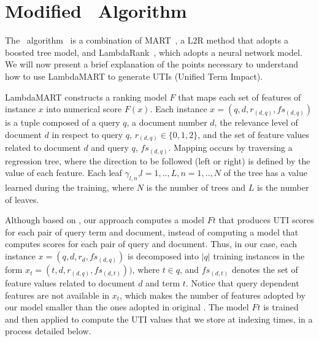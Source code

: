 \documentclass[preprint,review,10pt,3p]{elsarticle}
\begin{document}



\section{Modified \lambdamart\ Algorithm}
\label{lambda}
\newcommand{\lamdamart}{LambdaMART}

The \lambdamart\ algorithm~\cite{wu2010lambdamart} is a combination of
MART~\cite{Jerome2001}, a L2R method that adopts a boosted tree model, and LambdaRank~\cite{Burges2006},
which adopts a neural network model. 
We will
now present a brief explanation of the points necessary to understand
how to use LambdaMART to generate UTIs (Unified Term Impact).

LambdaMART constructs a ranking model $F$ that maps
each set of features of instance $x$ into numerical score $F(x)$. Each instance $x=(q,d,r_{(d,q)},fs_{(d,q)})$ is a tuple composed of a query $q$, a document number $d$, the relevance level of document $d$ in respect to query $q$, $r_{(d,q)} \in \{0,1,2\}$, and the set of feature values related to document $d$ and query $q$, $fs_{(d,q)}$.   Mapping occurs by traversing a regression tree, where the direction to be followed (left or right) is defined by the value of each feature. Each leaf $\gamma_{l,n}$,$l=1,..,L, n=1,..,N$ of the tree has a value learned during the training, where $N$ is the number of trees and $L$ is the number of leaves.

Although based on \lambdamart, our approach computes a model $Ft$
that produces UTI scores for each pair of query term and document, instead of computing a  model that computes scores for each pair of query and document. Thus, in our case, each instance $x=(q,d,r_d,fs_{(d,q)})$ is
decomposed into $|q|$ training instances in the form $x_t=
(t,d,r_{(d,q)},fs_{(d,t)}))$, where $t \in q$, and $fs_{(d,t)}$ denotes the
set of feature values related to document $d$ and term $t$. Notice
that query dependent features are not available in $x_t$, which makes
the number of features adopted by our model smaller than the ones
adopted in original \lambdamart. The model $Ft$ is trained and then
applied to compute the UTI values that we store at indexing times, in a process detailed below.
\end{document}
